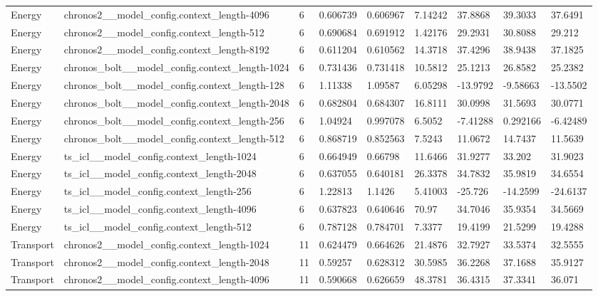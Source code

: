 \begin{tabular}{lllllllll}
Energy & chronos2\_\_model\_config.context\_length-4096 & 6 & 0.606739 & 0.606967 & 7.14242 & 37.8868 & 39.3033 & 37.6491 \\
Energy & chronos2\_\_model\_config.context\_length-512 & 6 & 0.690684 & 0.691912 & 1.42176 & 29.2931 & 30.8088 & 29.212 \\
Energy & chronos2\_\_model\_config.context\_length-8192 & 6 & 0.611204 & 0.610562 & 14.3718 & 37.4296 & 38.9438 & 37.1825 \\
Energy & chronos\_bolt\_\_model\_config.context\_length-1024 & 6 & 0.731436 & 0.731418 & 10.5812 & 25.1213 & 26.8582 & 25.2382 \\
Energy & chronos\_bolt\_\_model\_config.context\_length-128 & 6 & 1.11338 & 1.09587 & 6.05298 & -13.9792 & -9.58663 & -13.5502 \\
Energy & chronos\_bolt\_\_model\_config.context\_length-2048 & 6 & 0.682804 & 0.684307 & 16.8111 & 30.0998 & 31.5693 & 30.0771 \\
Energy & chronos\_bolt\_\_model\_config.context\_length-256 & 6 & 1.04924 & 0.997078 & 6.5052 & -7.41288 & 0.292166 & -6.42489 \\
Energy & chronos\_bolt\_\_model\_config.context\_length-512 & 6 & 0.868719 & 0.852563 & 7.5243 & 11.0672 & 14.7437 & 11.5639 \\
Energy & ts\_icl\_\_model\_config.context\_length-1024 & 6 & 0.664949 & 0.66798 & 11.6466 & 31.9277 & 33.202 & 31.9023 \\
Energy & ts\_icl\_\_model\_config.context\_length-2048 & 6 & 0.637055 & 0.640181 & 26.3378 & 34.7832 & 35.9819 & 34.6554 \\
Energy & ts\_icl\_\_model\_config.context\_length-256 & 6 & 1.22813 & 1.1426 & 5.41003 & -25.726 & -14.2599 & -24.6137 \\
Energy & ts\_icl\_\_model\_config.context\_length-4096 & 6 & 0.637823 & 0.640646 & 70.97 & 34.7046 & 35.9354 & 34.5669 \\
Energy & ts\_icl\_\_model\_config.context\_length-512 & 6 & 0.787128 & 0.784701 & 7.3377 & 19.4199 & 21.5299 & 19.4288 \\
Transport & chronos2\_\_model\_config.context\_length-1024 & 11 & 0.624479 & 0.664626 & 21.4876 & 32.7927 & 33.5374 & 32.5555 \\
Transport & chronos2\_\_model\_config.context\_length-2048 & 11 & 0.59257 & 0.628312 & 30.5985 & 36.2268 & 37.1688 & 35.9127 \\
Transport & chronos2\_\_model\_config.context\_length-4096 & 11 & 0.590668 & 0.626659 & 48.3781 & 36.4315 & 37.3341 & 36.071 \\

\end{tabular}

